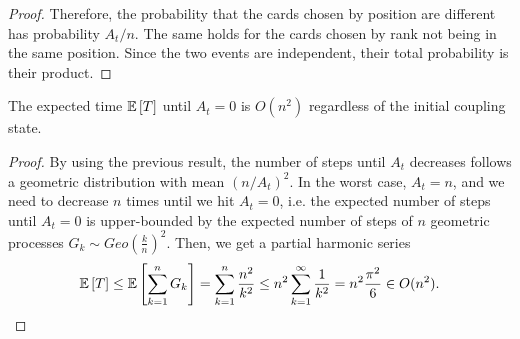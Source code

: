 \begin{aufgabe}
\begin{proof}
     Therefore, the probability that the cards chosen by position are different has probability $A_t/n$.
     The same holds for the cards chosen by rank not being in the same position.
     Since the two events are independent, their total probability is their product.
 \end{proof}
 The expected time $\mathbb{E}\left[T\right]$ until $A_t=0$ is $O(n^2)$ regardless of the initial coupling state.
 \begin{proof}
     By using the previous result, the number of steps until $A_t$ decreases follows a geometric distribution with mean $(n/A_t)^2$. In the worst case, $A_t=n$, and we need to decrease $n$ times until we hit $A_t=0$,
     i.e. the expected number of steps until $A_t=0$ is upper-bounded by the expected number of steps of $n$ geometric processes $G_k \sim Geo \left(\frac{k}{n}\right)^2$.
     Then, we get a partial harmonic series
     \begin{align*}
         \mathbb{E}\left[T\right] \leq \mathbb{E}\left[\sum_{k=1}^{n} G_k\right] = \sum_{k=1}^n \frac{n^2}{k^2} \leq n^2 \sum_{k=1}^\infty \frac{1}{k^2} = n^2\frac{\pi^2}{6} \in O(n^2).
     \end{align*}
 \end{proof}
\end{aufgabe}
